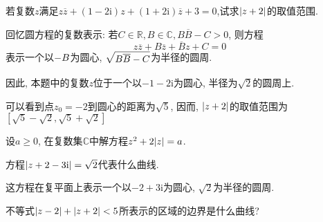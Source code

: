 \begin{yyEx}
	若复数$z$满足$z\overline{z} + (1-2\mathrm{i})z+(1+2\mathrm{i})\overline{z} + 3 = 0$,试求$\lvert z+2\rvert$的取值范围.
\end{yyEx}

\begin{yySolution}
	回忆圆方程的复数表示: 若$C\in\mathbb{R},B\in\mathbb{C},B\overline{B}-C>0$, 则方程
	\begin{equation*}
		z\overline{z} + B\overline{z} + \overline{B}z + C = 0
	\end{equation*}
	表示一个以$\begin{lgathered}
		-B
	\end{lgathered}$为圆心, $\begin{lgathered}
		\sqrt{B\overline{B}-C}
	\end{lgathered}$为半径的圆周.
	
	因此, 本题中的复数$z$位于一个以$-1-2\mathrm{i}$为圆心, 半径为$\sqrt{2}$的圆周上.
	
	可以看到点$z_0 = -2$到圆心的距离为$\sqrt{5}$, 因而, $\lvert z+2\rvert$的取值范围为$[\sqrt{5}-\sqrt{2},\sqrt{5}+\sqrt{2}]$
\end{yySolution}

\begin{yyEx}
	设$a\geqslant 0$, 在复数集$\mathbb{C}$中解方程$z^2 + 2\lvert z\rvert = a$.
\end{yyEx}

\begin{yySolution}
	
\end{yySolution}

\begin{yyEx}
	方程$\lvert z+2-3\mathrm{i}\rvert = \sqrt{2}$代表什么曲线.
\end{yyEx}

\begin{yySolution}
	这方程在复平面上表示一个以$-2+3\mathrm{i}$为圆心, $\sqrt{2}$为半径的圆周.
\end{yySolution}

\begin{yyEx}
	不等式$\lvert z-2\rvert+\lvert z+2\rvert<5$所表示的区域的边界是什么曲线?
\end{yyEx}

